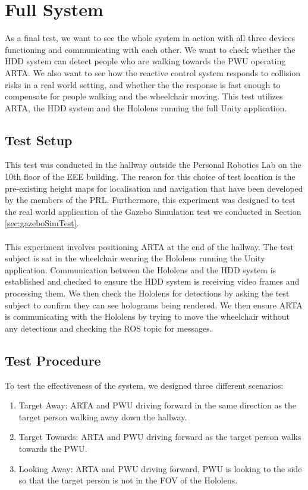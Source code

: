 \newpage

\section{Full System}
As a final test, we want to see the whole system in action with all three devices functioning and communicating with each other. We want to check whether the HDD system can detect people who are walking towards the PWU operating ARTA. We also want to see how the reactive control system responds to collision risks in a real world setting, and whether the the response is fast enough to compensate for people walking and the wheelchair moving. This test utilizes ARTA, the HDD system and the Hololens running the full Unity application.

\subsection{Test Setup}
This test was conducted in the hallway outside the Personal Robotics Lab on the 10th floor of the EEE building. The reason for this choice of test location is the pre-existing height maps for localisation and navigation that have been developed by the members of the PRL. Furthermore, this experiment was designed to test the real world application of the Gazebo Simulation test we conducted in Section \ref{sec:gazeboSimTest}.

\paragraph{}This experiment involves positioning ARTA at the end of the hallway. The test subject is sat in the wheelchair wearing the Hololens running the Unity application. Communication between the Hololens and the HDD system is established and checked to ensure the HDD system is receiving video frames and processing them. We then check the Hololens for detections by asking the test subject to confirm they can see holograms being rendered. We then ensure ARTA is communicating with the Hololens by trying to move the wheelchair without any detections and checking the  ROS topic for messages.

\subsection{Test Procedure}
To test the effectiveness of the system, we designed three different scenarios:

\begin{enumerate}
	\item Target Away: ARTA and PWU driving forward in the same direction as the target person walking away down the hallway.
	\item Target Towards: ARTA and PWU driving forward as the target person walks towards the PWU.
	\item Looking Away: ARTA and PWU driving forward, PWU is looking to the side so that the target person is not in the FOV of the Hololens.
\end{enumerate}

